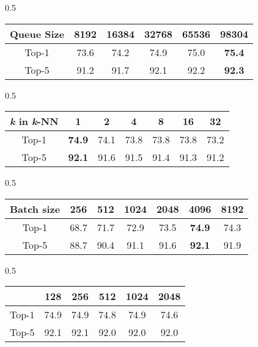 \begin{table*}[h]
\begin{subtable}[h]{0.5\textwidth}
    \centering
    \begin{tabular}{c|ccccc}
         Queue Size & 8192 & 16384 & 32768 & 65536 & 98304 \\
         \midrule
         Top-1 & 73.6 &  74.2 & 74.9 &  75.0 & \textbf{75.4}\\
         Top-5 & 91.2 &  91.7 & 92.1 &  92.2 & \textbf{92.3}\\
 
    \end{tabular}
    \caption{Support set size}
    \label{tab:queuesize}
   \end{subtable}
   \hfill
  \begin{subtable}[h]{0.5\textwidth}
    \centering
    \begin{tabular}{c|cccccc}
       \textit{k} in \textit{k}-NN  & 1& 2 & 4 & 8 & 16 & 32\\
         \midrule
         Top-1 & \textbf{74.9} & 74.1 & 73.8 &  73.8 & 73.8 & 73.2\\
         Top-5 & \textbf{92.1} & 91.6 & 91.5  & 91.4 & 91.3 & 91.2\\
    \end{tabular}
    \caption{Varying k in k-NN}
    \label{tab:topk}
    \end{subtable}
    \hfill
    
	\begin{subtable}[h]{0.5\textwidth}
		\centering
    \centering
    \begin{tabular}{c|cccccc}
         Batch size & 256 & 512 & 1024 & 2048 & 4096 & 8192\\
         \midrule
         Top-1 & 68.7 & 71.7 & 72.9 & 73.5 & \textbf{74.9 }& 74.3 \\
         Top-5 & 88.7 & 90.4 & 91.1 & 91.6 & \textbf{92.1} & 91.9\\
    \end{tabular}
    \caption{Batch size.}
    \label{tab:batch_size}
	\end{subtable}
	\hfill
	\begin{subtable}[h]{0.5\textwidth}
		\centering
		\begin{tabular}{c|ccccc}
          & 128 & 256 & 512 & 1024 & 2048\\
         \midrule
         Top-1 & 74.9 & 74.9 & 74.8 & 74.9 & 74.6\\
         Top-5 & 92.1 & 92.1 & 92.0 & 92.0 & 92.0\\
    \end{tabular}
    \caption{Varying embedding size }
    \label{tab:embedding_size}
	\end{subtable}
	\hfill
	

\end{table*}
